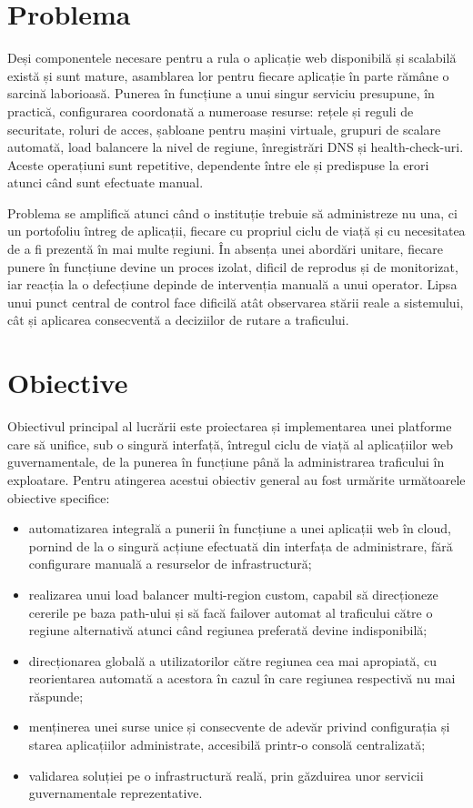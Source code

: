 \documentclass[12pt,a4paper]{report}
\begin{document}
\section{Problema}
Deși componentele necesare pentru a rula o aplicație web disponibilă și scalabilă există și sunt mature, asamblarea lor pentru fiecare aplicație în parte rămâne o sarcină laborioasă. Punerea în funcțiune a unui singur serviciu presupune, în practică, configurarea coordonată a numeroase resurse: rețele și reguli de securitate, roluri de acces, șabloane pentru mașini virtuale, grupuri de scalare automată, load balancere la nivel de regiune, înregistrări DNS și health-check-uri. Aceste operațiuni sunt repetitive, dependente între ele și predispuse la erori atunci când sunt efectuate manual.

Problema se amplifică atunci când o instituție trebuie să administreze nu una, ci un portofoliu întreg de aplicații, fiecare cu propriul ciclu de viață și cu necesitatea de a fi prezentă în mai multe regiuni. În absența unei abordări unitare, fiecare punere în funcțiune devine un proces izolat, dificil de reprodus și de monitorizat, iar reacția la o defecțiune depinde de intervenția manuală a unui operator. Lipsa unui punct central de control face dificilă atât observarea stării reale a sistemului, cât și aplicarea consecventă a deciziilor de rutare a traficului.

\section{Obiective}
Obiectivul principal al lucrării este proiectarea și implementarea unei platforme care să unifice, sub o singură interfață, întregul ciclu de viață al aplicațiilor web guvernamentale, de la punerea în funcțiune până la administrarea traficului în exploatare. Pentru atingerea acestui obiectiv general au fost urmărite următoarele obiective specifice:

\begin{itemize}
	\item automatizarea integrală a punerii în funcțiune a unei aplicații web în cloud, pornind de la o singură acțiune efectuată din interfața de administrare, fără configurare manuală a resurselor de infrastructură;
	\item realizarea unui load balancer multi-region custom, capabil să direcționeze cererile pe baza path-ului și să facă failover automat al traficului către o regiune alternativă atunci când regiunea preferată devine indisponibilă;
	\item direcționarea globală a utilizatorilor către regiunea cea mai apropiată, cu reorientarea automată a acestora în cazul în care regiunea respectivă nu mai răspunde;
	\item menținerea unei surse unice și consecvente de adevăr privind configurația și starea aplicațiilor administrate, accesibilă printr-o consolă centralizată;
	\item validarea soluției pe o infrastructură reală, prin găzduirea unor servicii guvernamentale reprezentative.
\end{itemize}
\end{document}
